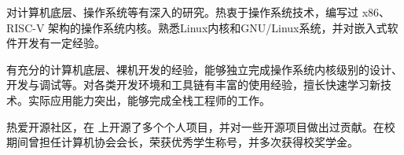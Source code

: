 \documentclass[zh]{resume}
\begin{document}
\makeheader

\begin{paragraph}
对计算机底层、操作系统等有深入的研究。热衷于操作系统技术，编写过 x86、RISC-V 架构的操作系统内核。熟悉Linux内核和GNU/Linux系统，并对嵌入式软件开发有一定经验。 
\end{paragraph}
\begin{paragraph}
有充分的计算机底层、裸机开发的经验，能够独立完成操作系统内核级别的设计、开发与调试等。对各类开发环境和工具链有丰富的使用经验，擅长快速学习新技术。实际应用能力突出，能够完成全栈工程师的工作。
\end{paragraph}
\begin{paragraph}
热爱开源社区，在 上开源了多个个人项目，并对一些开源项目做出过贡献。在校期间曾担任计算机协会会长，荣获优秀学生称号，并多次获得校奖学金。
\end{paragraph}


\begin{competences}[7em]
\end{competences}

\end{document}
